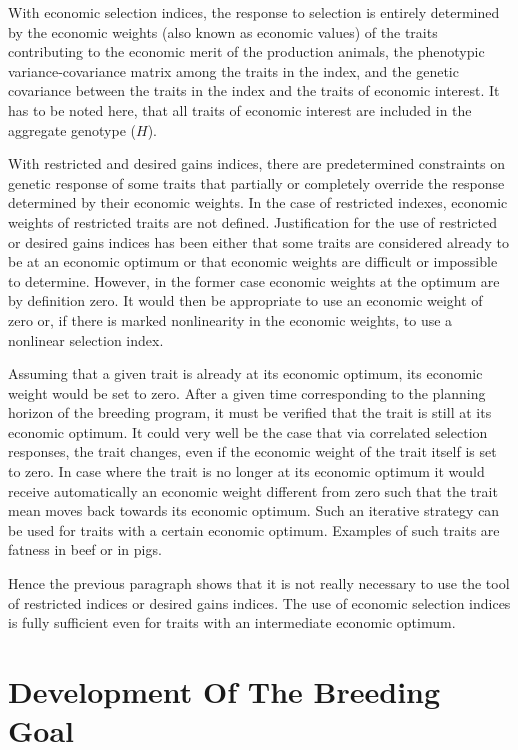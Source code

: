 \documentclass[
]{book}
\begin{document}
With economic selection indices, the response to selection is entirely determined by the economic weights (also known as economic values) of the traits contributing to the economic merit of the production animals, the phenotypic variance-covariance matrix among the traits in the index, and the genetic covariance between the traits in the index and the traits of economic interest. It has to be noted here, that all traits of economic interest are included in the aggregate genotype (\(H\)).

With restricted and desired gains indices, there are predetermined constraints on genetic response of some traits that partially or completely override the response determined by their economic weights. In the case of restricted indexes, economic weights of restricted traits are not defined. Justification for the use of restricted or desired gains indices has been either that some traits are considered already to be at an economic optimum or that economic weights are difficult or impossible to determine. However, in the former case economic weights at the optimum are by definition zero. It would then be appropriate to use an economic weight of zero or, if there is marked nonlinearity in the economic weights, to use a nonlinear selection index.

Assuming that a given trait is already at its economic optimum, its economic weight would be set to zero. After a given time corresponding to the planning horizon of the breeding program, it must be verified that the trait is still at its economic optimum. It could very well be the case that via correlated selection responses, the trait changes, even if the economic weight of the trait itself is set to zero. In case where the trait is no longer at its economic optimum it would receive automatically an economic weight different from zero such that the trait mean moves back towards its economic optimum. Such an iterative strategy can be used for traits with a certain economic optimum. Examples of such traits are fatness in beef or in pigs.

Hence the previous paragraph shows that it is not really necessary to use the tool of restricted indices or desired gains indices. The use of economic selection indices is fully sufficient even for traits with an intermediate economic optimum.

\hypertarget{gel-implbp-devbg}{%
\section{Development Of The Breeding Goal}\label{gel-implbp-devbg}}
\end{document}
